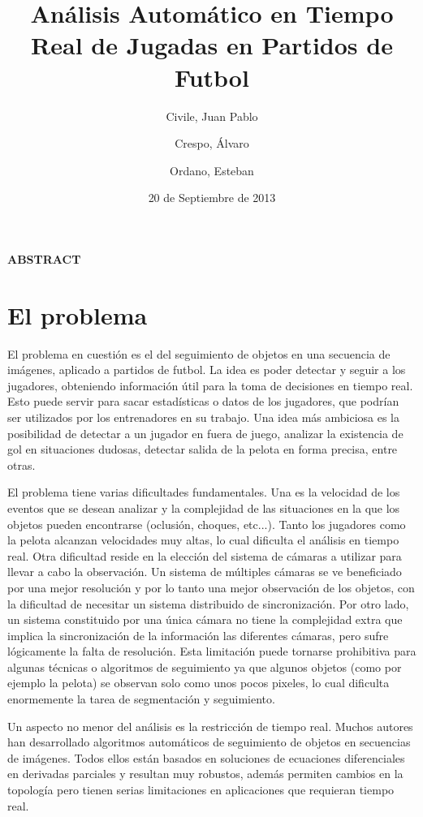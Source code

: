 \documentclass[a4paper,10pt]{article}
\title{Análisis Automático en Tiempo Real de Jugadas en Partidos de Futbol}
\date{20 de Septiembre de 2013}
\author{Civile, Juan Pablo \and Crespo, Álvaro \and Ordano, Esteban }
\begin{document}
\pagestyle{fancy}
\maketitle
\thispagestyle{fancy}


\begin{customabstract}
\textbf{
ABSTRACT
} \end{customabstract}

\part*{El problema}

El problema en cuestión es el del seguimiento de objetos en una secuencia de imágenes, aplicado a partidos de futbol.
La idea es poder detectar y seguir a los jugadores, obteniendo información útil para la toma de decisiones en tiempo real. 
Esto puede servir para sacar estadísticas o datos de los jugadores, que podrían ser utilizados por los entrenadores en su trabajo.
Una idea más ambiciosa es la posibilidad de detectar a un jugador en fuera de juego, analizar la existencia de gol en situaciones 
dudosas, detectar salida de la pelota en forma precisa, entre otras.

El problema tiene varias dificultades fundamentales. Una es la velocidad de los eventos que se desean analizar y la complejidad
de las situaciones en la que los objetos pueden encontrarse (oclusión, choques, etc...). Tanto
los jugadores como la pelota alcanzan velocidades muy altas, lo cual dificulta el análisis en tiempo real. Otra dificultad 
reside en la elección del sistema de cámaras a utilizar para llevar a cabo la observación. Un sistema de múltiples cámaras se
ve beneficiado por una mejor resolución y por lo tanto una mejor observación de los objetos, con la dificultad de necesitar un
sistema distribuido de sincronización. Por otro lado, un sistema constituido por una única cámara no tiene la complejidad extra
que implica la sincronización de la información las diferentes cámaras, pero sufre lógicamente la falta de resolución. Esta 
limitación puede tornarse prohibitiva para algunas técnicas o algoritmos de seguimiento ya que algunos objetos (como por ejemplo
la pelota) se observan solo como unos pocos pixeles, lo cual dificulta enormemente la tarea de segmentación y seguimiento.

Un aspecto no menor del análisis es la restricción de tiempo real. Muchos autores han desarrollado algoritmos automáticos 
de seguimiento de objetos en secuencias de imágenes. Todos ellos están basados en soluciones de ecuaciones diferenciales 
en derivadas parciales y resultan muy robustos, además permiten cambios en la topología pero tienen serias limitaciones 
en aplicaciones que requieran tiempo real.
\end{document}
